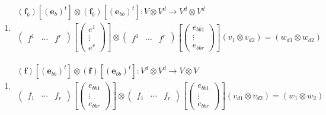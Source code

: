 \documentclass[aps,preprint]{revtex4}
\begin{document}
\begin{enumerate}
\begin{enumerate}
\item 
\begin{gather}
\left( \boldsymbol{f}_{b}\right) \left[ \left( \mathbf{e}_{b}\right) ^{t}%
\right] \otimes \left( \boldsymbol{f}_{b}\right) \left[ \left( \mathbf{e}%
_{bb}\right) ^{t}\right] :V\otimes V^{d}\rightarrow V^{d}\otimes V^{d} \\
\left( 
\begin{array}{ccc}
f^{1} & \cdots & f^{r}%
\end{array}%
\right) \left[ \left( 
\begin{array}{c}
e^{1} \\ 
\vdots \\ 
e^{r}%
\end{array}%
\right) \right] \otimes \left( 
\begin{array}{ccc}
f^{1} & \cdots & f^{r}%
\end{array}%
\right) \left[ \left( 
\begin{array}{c}
e_{bb1} \\ 
\vdots \\ 
e_{bbr}%
\end{array}%
\right) \right] \left( v_{1}\otimes v_{d2}\right) =\left( w_{d1}\otimes
w_{d2}\right)
\end{gather}
\end{enumerate}

\begin{enumerate}
\item 
\begin{gather}
\left( \boldsymbol{f}\right) \left[ \left( \mathbf{e}_{bb}\right) ^{t}\right]
\otimes \left( \boldsymbol{f}\right) \left[ \left( \mathbf{e}_{bb}\right)
^{t}\right] :V^{d}\otimes V^{d}\rightarrow V\otimes V \\
\left( 
\begin{array}{ccc}
f_{1} & \cdots & f_{r}%
\end{array}%
\right) \left[ \left( 
\begin{array}{c}
e_{bb1} \\ 
\vdots \\ 
e_{bbr}%
\end{array}%
\right) \right] \otimes \left( 
\begin{array}{ccc}
f_{1} & \cdots & f_{r}%
\end{array}%
\right) \left[ \left( 
\begin{array}{c}
e_{bb1} \\ 
\vdots \\ 
e_{bbr}%
\end{array}%
\right) \right] \left( v_{d1}\otimes v_{d2}\right) =\left( w_{1}\otimes
w_{2}\right)
\end{gather}


\end{enumerate}
\end{enumerate}
\end{document}
